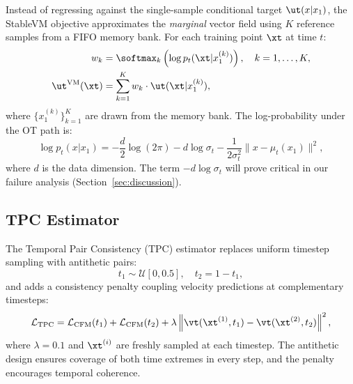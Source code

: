 Instead of regressing against the single-sample conditional target $\ut(x | x_1)$, the StableVM objective approximates the \emph{marginal} vector field using $K$ reference samples from a FIFO memory bank. For each training point $\xt$ at time $t$:
\begin{align}
    w_k &= \softmax_k \left( \log p_t(\xt | x_1^{(k)}) \right), \quad k = 1, \ldots, K, \label{eq:stablevm_weights} \\
    \ut^{\text{VM}}(\xt) &= \sum_{k=1}^{K} w_k \cdot \ut(\xt | x_1^{(k)}), \label{eq:stablevm_target}
\end{align}
where $\{x_1^{(k)}\}_{k=1}^K$ are drawn from the memory bank. The log-probability under the OT path is:
\begin{equation}
    \log p_t(x | x_1) = -\frac{d}{2} \log(2\pi) - d \log \sigma_t - \frac{1}{2\sigma_t^2} \|x - \mu_t(x_1)\|^2,
    \label{eq:log_prob}
\end{equation}
where $d$ is the data dimension. The term $-d \log \sigma_t$ will prove critical in our failure analysis (Section~\ref{sec:discussion}).

\subsection{TPC Estimator}
\label{sec:tpc}

The Temporal Pair Consistency (TPC) estimator replaces uniform timestep sampling with antithetic pairs:
\begin{equation}
    t_1 \sim \mathcal{U}[0, 0.5], \quad t_2 = 1 - t_1,
\end{equation}
and adds a consistency penalty coupling velocity predictions at complementary timesteps:
\begin{equation}
    \mathcal{L}_{\text{TPC}} = \mathcal{L}_{\text{CFM}}(t_1) + \mathcal{L}_{\text{CFM}}(t_2) + \lambda \left\| \vt(\xt^{(1)}, t_1) - \vt(\xt^{(2)}, t_2) \right\|^2,
    \label{eq:tpc_loss}
\end{equation}
where $\lambda = 0.1$ and $\xt^{(i)}$ are freshly sampled at each timestep. The antithetic design ensures coverage of both time extremes in every step, and the penalty encourages temporal coherence.
